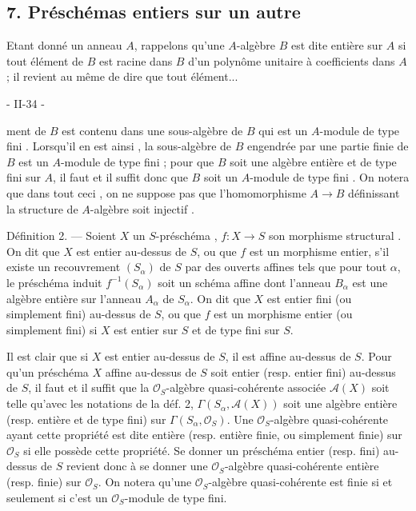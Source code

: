 \subsection*{7. Préschémas entiers sur un autre}

Etant donné un anneau $A$, rappelons qu'une $A$-algèbre $B$ est dite entière sur $A$ si tout élément de $B$ est racine dans $B$ d'un polynôme unitaire à coefficients dans $A$; il revient au même de dire que tout élément...

\newpage


- II-34 -

ment de $B$ est contenu dans une sous-algèbre de $B$ qui est un $A$-module de type fini . Lorsqu'il en est ainsi , la sous-algèbre de $B$ engendrée par une partie finie de $B$ est un $A$-module de type fini ; pour que $B$ soit une algèbre entière et de type fini sur $A$, il faut et il suffit donc que $B$ soit un $A$-module de type fini . On notera que dans tout ceci , on ne suppose pas que l'homomorphisme $A \to B$ définissant la structure de $A$-algèbre soit injectif .

Définition 2. — Soient $X$ un $S$-préschéma , $f: X \to S$ son morphisme structural . On dit que $X$ est entier au-dessus de $S$, ou que $f$ est un morphisme entier, s'il existe un recouvrement $(S_\alpha)$ de $S$ par des ouverts affines tels que pour tout $\alpha$, le préschéma induit $f^{-1}(S_\alpha)$ soit un schéma affine dont l'anneau $B_\alpha$ est une algèbre entière sur l'anneau $A_\alpha$ de $S_\alpha$. On dit que $X$ est entier fini (ou simplement fini) au-dessus de $S$, ou que $f$ est un morphisme entier (ou simplement fini) si $X$ est entier sur $S$ et de type fini sur $S$.

Il est clair que si $X$ est entier au-dessus de $S$, il est affine au-dessus de $S$. Pour qu'un préschéma $X$ affine au-dessus de $S$ soit entier (resp. entier fini) au-dessus de $S$, il faut et il suffit que la $\mathcal{O}_S$-algèbre quasi-cohérente associée $\mathcal{A}(X)$ soit telle qu'avec les notations de la déf. 2, $\Gamma(S_\alpha, \mathcal{A}(X))$ soit une algèbre entière (resp. entière et de type fini) sur $\Gamma(S_\alpha, \mathcal{O}_S)$. Une $\mathcal{O}_S$-algèbre quasi-cohérente ayant cette propriété est dite entière (resp. entière finie, ou simplement finie) sur $\mathcal{O}_S$ si elle possède cette propriété. Se donner un préschéma entier (resp. fini) au-dessus de $S$ revient donc à se donner une $\mathcal{O}_S$-algèbre quasi-cohérente entière (resp. finie) sur $\mathcal{O}_S$. On notera qu'une $\mathcal{O}_S$-algèbre quasi-cohérente est finie si et seulement si c'est un $\mathcal{O}_S$-module de type fini.

